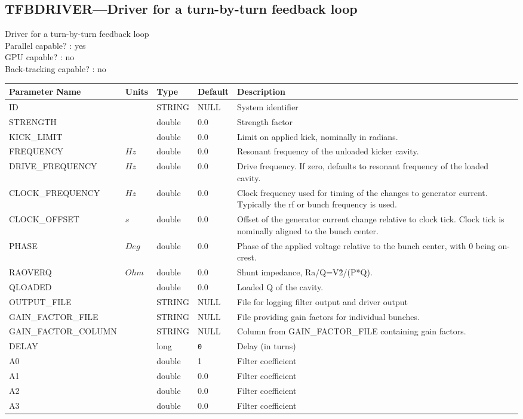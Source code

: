 \subsection{TFBDRIVER---Driver for a turn-by-turn feedback loop}
Driver for a turn-by-turn feedback loop
\\
Parallel capable? : yes\\
GPU capable? : no\\
Back-tracking capable? : no\\
\begin{tabular}{|l|l|l|l|p{\descwidth}|} \hline
Parameter Name & Units & Type & Default & Description \\ \hline 
ID &  & STRING &   NULL            & System identifier  \\ \hline 
STRENGTH &  & double &  0.0 & Strength factor  \\ \hline 
KICK\_LIMIT &  & double &  0.0 & Limit on applied kick, nominally in radians.  \\ \hline 
FREQUENCY & $Hz$ & double &  0.0 & Resonant frequency of the unloaded kicker cavity.  \\ \hline 
DRIVE\_FREQUENCY & $Hz$ & double &  0.0 & Drive frequency. If zero, defaults to resonant frequency of the loaded cavity.  \\ \hline 
CLOCK\_FREQUENCY & $Hz$ & double &  0.0 & Clock frequency used for timing of the changes to generator current. Typically the rf or bunch frequency is used.  \\ \hline 
CLOCK\_OFFSET & $s$ & double &  0.0 & Offset of the generator current change relative to clock tick. Clock tick is nominally aligned to the bunch center.  \\ \hline 
PHASE & $Deg$ & double &  0.0 & Phase of the applied voltage relative to the bunch center, with 0 being on-crest.  \\ \hline 
RAOVERQ & $Ohm$ & double &  0.0 & Shunt impedance, Ra/Q=V\^2/(P*Q).  \\ \hline 
QLOADED &  & double &  0.0 & Loaded Q of the cavity.  \\ \hline 
OUTPUT\_FILE &  & STRING &   NULL            & File for logging filter output and driver output  \\ \hline 
GAIN\_FACTOR\_FILE &  & STRING &   NULL            & File providing gain factors for individual bunches.  \\ \hline 
GAIN\_FACTOR\_COLUMN &  & STRING &   NULL            & Column from GAIN\_FACTOR\_FILE containing gain factors.  \\ \hline 
DELAY &  & long &  \verb|0| & Delay (in turns)  \\ \hline 
A0 &  & double &   1 & Filter coefficient  \\ \hline 
A1 &  & double &  0.0 & Filter coefficient  \\ \hline 
A2 &  & double &  0.0 & Filter coefficient  \\ \hline 
A3 &  & double &  0.0 & Filter coefficient  \\ \hline 
\end{tabular}

